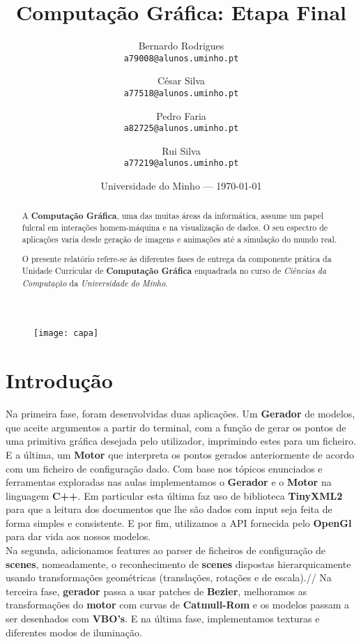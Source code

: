 \documentclass{article}
\title{Computação Gráfica: Etapa Final } %
\author{Bernardo Rodrigues\\ \texttt{a79008@alunos.uminho.pt}\\ \and César Silva\\ \texttt{a77518@alunos.uminho.pt}\\ \and Pedro Faria\\ \texttt{a82725@alunos.uminho.pt} \and Rui Silva\\ \texttt{a77219@alunos.uminho.pt}\\} %
\date{Universidade do Minho --- \today} %
\begin{document}
\maketitle 
\begin{figure}[H]
	\centering
	\texttt{[image: capa]}
\end{figure}
\newpage

\begin{abstract}
A \textbf{Computação Gráfica}, uma das muitas áreas da informática, assume um papel fulcral em interações homem-máquina e na visualização de dados. O seu espectro de aplicações varia desde geração de imagens e animações até a simulação do mundo real. \par
	O presente relatório refere-se às diferentes fases de entrega da componente prática da Unidade Curricular de \textbf{Computação Gráfica} enquadrada no curso de \textit{Ciências da Computação} da \textit{Universidade do Minho}. 
\end{abstract}
\newpage


\tableofcontents{}
\newpage



\section{Introdução}
Na primeira fase, foram desenvolvidas duas aplicações. Um \textbf{Gerador} de modelos, que aceite argumentos a partir do terminal, com a função de gerar os pontos de uma primitiva gráfica desejada pelo utilizador, imprimindo estes para um ficheiro. E a última, um \textbf{Motor} que interpreta os pontos gerados anteriormente de acordo com um ficheiro de configuração dado. 
Com base nos tópicos enunciados e ferramentas exploradas nas aulas implementamos o \textbf{Gerador} e o \textbf{Motor} na linguagem \textbf{C++}. Em particular esta última faz uso de biblioteca \textbf{TinyXML2} para que a leitura dos documentos que lhe são dados com input seja feita de forma simples e consistente. E por fim,  utilizamos a API fornecida pelo \textbf{OpenGl} para dar vida aos nossos modelos.\\
Na segunda, adicionamos features ao parser de ficheiros de configuração de \textbf{scenes}, nomeadamente, o reconhecimento de \textbf{scenes} dispostas hierarquicamente usando transformações geométricas (translações, rotações e de escala).//
Na terceira fase, \textbf{gerador} passa a usar patches de \textbf{ Bezier}, melhoramos as transformações do \textbf{motor} com curvas de \textbf{Catmull-Rom} e os modelos passam a ser desenhados com \textbf{VBO’s}.
E na última fase, implementamos texturas e diferentes modos de iluminação.
\end{document}
